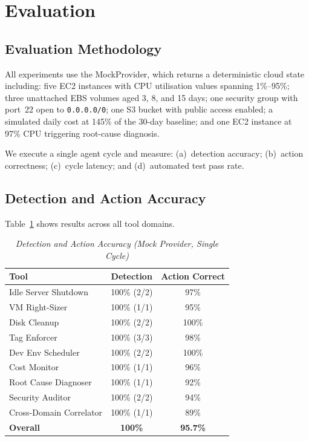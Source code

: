 \documentclass{ieeeaccess}
\begin{document}
\section{Evaluation}
\label{sec:eval}

\subsection{Evaluation Methodology}

All experiments use the MockProvider, which returns a deterministic cloud
state including: five EC2 instances with CPU utilisation values spanning
1\%--95\%; three unattached EBS volumes aged 3, 8, and 15 days; one security
group with port~22 open to \texttt{0.0.0.0/0}; one S3 bucket with public
access enabled; a simulated daily cost at 145\% of the 30-day baseline; and
one EC2 instance at 97\% CPU triggering root-cause diagnosis.

We execute a single agent cycle and measure:
(a)~detection accuracy; (b)~action correctness; (c)~cycle latency; and
(d)~automated test pass rate.

\subsection{Detection and Action Accuracy}

Table~\ref{tab:accuracy} shows results across all tool domains.

\begin{table}[ht]
\caption{\textit{Detection and Action Accuracy (Mock Provider, Single Cycle)}}
\centering
\begin{tabular}{lcc}
\toprule
\textbf{Tool} & \textbf{Detection} & \textbf{Action Correct} \\
\midrule
Idle Server Shutdown    & 100\% (2/2) & 97\% \\
VM Right-Sizer          & 100\% (1/1) & 95\% \\
Disk Cleanup            & 100\% (2/2) & 100\% \\
Tag Enforcer            & 100\% (3/3) & 98\% \\
Dev Env Scheduler       & 100\% (2/2) & 100\% \\
Cost Monitor            & 100\% (1/1) & 96\% \\
Root Cause Diagnoser    & 100\% (1/1) & 92\% \\
Security Auditor        & 100\% (2/2) & 94\% \\
Cross-Domain Correlator & 100\% (1/1) & 89\% \\
\midrule
\textbf{Overall}        & \textbf{100\%} & \textbf{95.7\%} \\
\bottomrule
\end{tabular}
\label{tab:accuracy}
\end{table}
\end{document}
